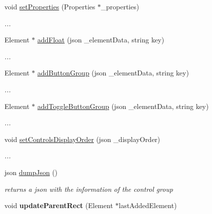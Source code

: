 \begin{DoxyCompactItemize}
void \mbox{\hyperlink{class_controls_group_a591c730dd207bd39152f550c6ff01f94}{set\+Properties}} (Properties $\ast$\+\_\+properties)
\begin{DoxyCompactList}\small\item\em ... \end{DoxyCompactList}\item 
\mbox{\label{class_controls_group_aefd772a7034081fbcce964f96ae20947}} 
Element $\ast$ \mbox{\hyperlink{class_controls_group_aefd772a7034081fbcce964f96ae20947}{add\+Float}} (json \+\_\+element\+Data, string key)
\begin{DoxyCompactList}\small\item\em ... \end{DoxyCompactList}\item 
\mbox{\label{class_controls_group_a0fce3a0d0d3f1a7f86fe614b50c091d4}} 
Element $\ast$ \mbox{\hyperlink{class_controls_group_a0fce3a0d0d3f1a7f86fe614b50c091d4}{add\+Button\+Group}} (json \+\_\+element\+Data, string key)
\begin{DoxyCompactList}\small\item\em ... \end{DoxyCompactList}\item 
\mbox{\label{class_controls_group_a9cc5691e2f7376342627d4e23554f338}} 
Element $\ast$ \mbox{\hyperlink{class_controls_group_a9cc5691e2f7376342627d4e23554f338}{add\+Toggle\+Button\+Group}} (json \+\_\+element\+Data, string key)
\begin{DoxyCompactList}\small\item\em ... \end{DoxyCompactList}\item 
\mbox{\label{class_controls_group_a38a87e6db9f03df1fc4a53831f27bdb5}} 
void \mbox{\hyperlink{class_controls_group_a38a87e6db9f03df1fc4a53831f27bdb5}{set\+Controls\+Display\+Order}} (json \+\_\+display\+Order)
\begin{DoxyCompactList}\small\item\em ... \end{DoxyCompactList}\item 
json \mbox{\hyperlink{class_controls_group_a603fcb3050fd34c148a0bb4e85890474}{dump\+Json}} ()
\begin{DoxyCompactList}\small\item\em returns a json with the information of the control group \end{DoxyCompactList}\item 
\mbox{\label{class_controls_group_a98939ab75fed4fb25d0ff769c871c87c}} 
void {\bfseries update\+Parent\+Rect} (Element $\ast$last\+Added\+Element)
\end{DoxyCompactItemize}


